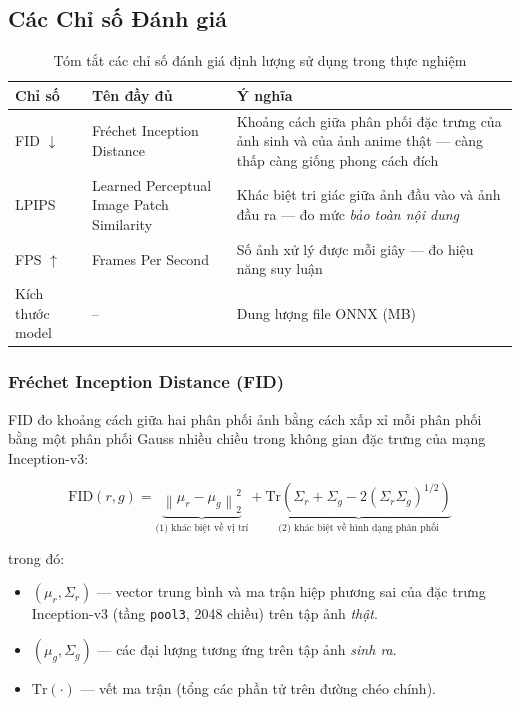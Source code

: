 \subsection{Các Chỉ số Đánh giá}
\label{subsec:metrics}

\begin{table}[H]
\caption{Tóm tắt các chỉ số đánh giá định lượng sử dụng trong thực nghiệm}
\label{tab:metrics_desc}
\centering
\begin{tabular}{|p{2.5cm}|p{4cm}|p{7cm}|}
\hline
\textbf{Chỉ số} & \textbf{Tên đầy đủ} & \textbf{Ý nghĩa} \\
\hline
FID $\downarrow$ & Fréchet Inception Distance & Khoảng cách giữa phân phối đặc trưng của ảnh sinh và của ảnh anime thật --- càng thấp càng giống phong cách đích \cite{Heusel2017} \\
\hline
LPIPS & Learned Perceptual Image Patch Similarity & Khác biệt tri giác giữa ảnh đầu vào và ảnh đầu ra --- đo mức \textit{bảo toàn nội dung} \cite{Zhang2018LPIPS} \\
\hline
FPS $\uparrow$ & Frames Per Second & Số ảnh xử lý được mỗi giây --- đo hiệu năng suy luận \\
\hline
Kích thước model & -- & Dung lượng file ONNX (MB) \\
\hline
\end{tabular}
\end{table}

\subsubsection{Fréchet Inception Distance (FID)}

FID \cite{Heusel2017} đo khoảng cách giữa hai phân phối ảnh bằng cách xấp xỉ mỗi phân phối bằng một phân phối Gauss nhiều chiều trong không gian đặc trưng của mạng Inception-v3:

\begin{equation}
\label{eq:fid}
\text{FID}(r, g) = \underbrace{\left\| \mu_r - \mu_g \right\|_2^2}_{\text{(1) khác biệt về vị trí}} + \underbrace{\text{Tr}\!\left( \Sigma_r + \Sigma_g - 2\left(\Sigma_r \Sigma_g\right)^{1/2} \right)}_{\text{(2) khác biệt về hình dạng phân phối}}
\end{equation}

\noindent trong đó:
\begin{itemize}
    \item $(\mu_r, \Sigma_r)$ --- vector trung bình và ma trận hiệp phương sai của đặc trưng Inception-v3 (tầng \texttt{pool3}, 2048 chiều) trên tập ảnh \textit{thật}.
    \item $(\mu_g, \Sigma_g)$ --- các đại lượng tương ứng trên tập ảnh \textit{sinh ra}.
    \item $\text{Tr}(\cdot)$ --- vết ma trận (tổng các phần tử trên đường chéo chính).
\end{itemize}

